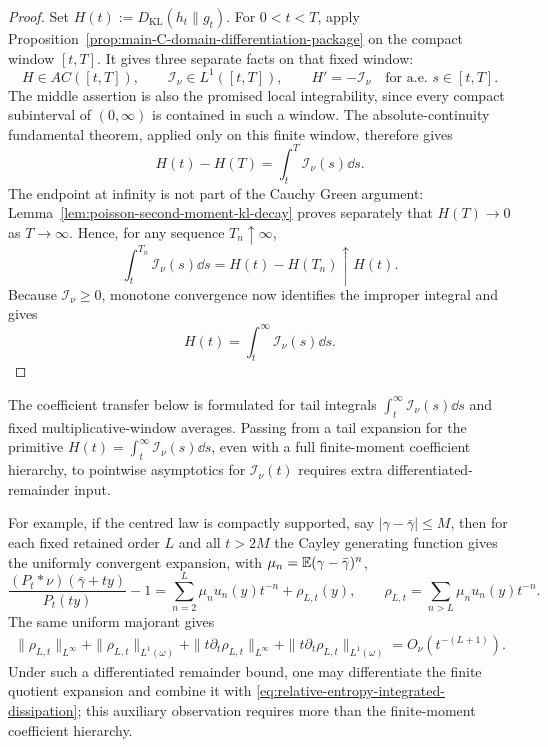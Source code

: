 \begin{proof}
Set \(H(t):=D_{\mathrm{KL}}(h_t\|g_t)\).  For \(0<t<T\), apply
Proposition~\ref{prop:main-C-domain-differentiation-package} on the compact
window \([t,T]\).  It gives three separate facts on that fixed window:
\[
H\in AC([t,T]),\qquad
\mathcal I_\nu\in L^1([t,T]),\qquad
H'=-\mathcal I_\nu\quad\text{for a.e. }s\in[t,T].
\]
The middle assertion is also the promised local integrability, since every
compact subinterval of \((0,\infty)\) is contained in such a window.  The
absolute-continuity fundamental theorem, applied only on this finite window,
therefore gives
\[
H(t)-H(T)=\int_t^T \mathcal I_\nu(s)\dd s.
\]
The endpoint at infinity is not part of the Cauchy Green argument:
Lemma~\ref{lem:poisson-second-moment-kl-decay} proves separately that
\(H(T)\to0\) as \(T\to\infty\).  Hence, for any sequence \(T_n\uparrow\infty\),
\[
\int_t^{T_n}\mathcal I_\nu(s)\dd s=H(t)-H(T_n)\uparrow H(t).
\]
Because \(\mathcal I_\nu\ge0\), monotone convergence now identifies the
improper integral and gives
\[
H(t)=\int_t^\infty \mathcal I_\nu(s)\dd s .
\]
\end{proof}

\begin{remark}
\label{rem:no-pointwise-dissipation-from-finite-moments}
The coefficient transfer below is formulated for tail integrals
\(\int_t^\infty\mathcal I_\nu(s)\dd s\) and fixed multiplicative-window
averages.  Passing from a tail expansion for the primitive
\(H(t)=\int_t^\infty\mathcal I_\nu(s)\dd s\), even with a full finite-moment
coefficient hierarchy, to pointwise asymptotics for \(\mathcal I_\nu(t)\)
requires extra differentiated-remainder input.

For example, if the centred law is compactly supported, say
\(|\gamma-\bar{\gamma}|\le M\), then for each fixed retained order \(L\) and
all \(t>2M\) the Cayley generating function gives the uniformly convergent
expansion, with \(\mu_n=\mathbb{E}(\gamma-\bar{\gamma})^n\),
\[
\frac{(P_t*\nu)(\bar{\gamma}+ty)}{P_t(ty)}-1
=\sum_{n=2}^{L}\mu_nu_n(y)t^{-n}+\rho_{L,t}(y),
\qquad
\rho_{L,t}=\sum_{n>L}\mu_nu_n(y)t^{-n}.
\]
The same uniform majorant gives
\[
\begin{aligned}
\|\rho_{L,t}\|_{L^\infty}
+\|\rho_{L,t}\|_{L^1(\omega)}
+\|t\partial_t\rho_{L,t}\|_{L^\infty}
+\|t\partial_t\rho_{L,t}\|_{L^1(\omega)}
=O_\nu(t^{-(L+1)}).
\end{aligned}
\]
Under such a differentiated remainder bound, one may
differentiate the finite quotient expansion and combine it with
\eqref{eq:relative-entropy-integrated-dissipation}; this auxiliary
observation requires more than the finite-moment coefficient hierarchy.
\end{remark}

